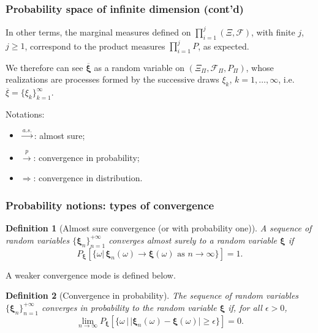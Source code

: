 \documentclass{beamer}
\newtheorem{defi}{Definition}
\def\bxi{\boldsymbol\xi}
\begin{document}
\begin{frame}
\frametitle{Probability space of infinite dimension (cont'd)}

In other terms, the marginal measures defined on $\prod_{i = 1}^j (\Xi, \mathcal{F})$, with finite $j$, $j \geq 1$, correspond to the product measures $\prod_{i = 1}^j P$, as expected.

\mbox{}

We therefore can see $\overline{\bxi}$ as a random variable on $\left( \Xi_{\Pi}, \mathcal{F}_{\Pi}, P_{\Pi} \right)$, whose realizations are processes formed by the successive draws $\xi_k$, $k = 1,\ldots,\infty$, i.e. 
$\overline{\xi} = \lbrace \xi_k \rbrace_{k = 1}^{\infty}$.

\mbox{}

{\blue Notations:}
\begin{itemize}
\item $\overset{a.s.}{\longrightarrow}$: almost sure;
\item $\overset{p}{\rightarrow}$: convergence in probability;
\item $\Rightarrow$: convergence in distribution.
\end{itemize}

\end{frame}

\begin{frame}
\frametitle{Probability notions: types of convergence}

\begin{defi}[Almost sure convergence (or with probability one)]
A sequence of random variables $\lbrace \bxi_n \rbrace_{n = 1}^{+\infty}$ converges almost surely to a random variable $\bxi$ if
\[
P_{\bxi} [ \lbrace \omega |\, \bxi_n(\omega) \rightarrow \bxi(\omega)
\text{ as } n \rightarrow \infty \rbrace ] = 1.
\]
\end{defi}

\mbox{}

A weaker convergence mode is defined below.

\begin{defi}[Convergence in probability]
The sequence of random variables $\lbrace \bxi_n \rbrace_{n =
  1}^{+\infty}$ converges in probability to the random variable $\bxi$ if, for all $\epsilon > 0$,
\[
\lim_{n \rightarrow \infty} P_{\bxi} [ \lbrace \omega \,|\, |
\bxi_n(\omega) - \bxi(\omega) | \geq \epsilon \rbrace ] = 0.
\]
\end{defi}

\end{frame}
\end{document}
